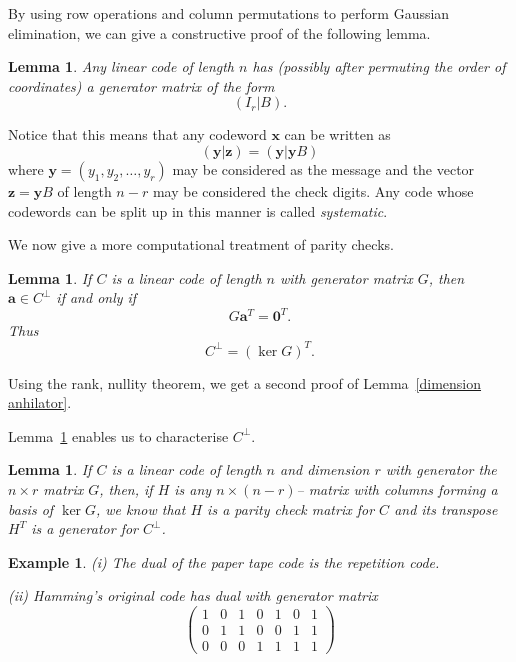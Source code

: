 \documentclass[12pt,a4paper]{article}
\theoremstyle{plain}
\newtheorem{lemma}[theorem]{Lemma}
\newtheorem{example}[theorem]{Example}
\theoremstyle{definition}
\begin{document}
    By using row operations and column permutations
    to perform Gaussian elimination, we
    can give a constructive proof of
    the following lemma.
    \begin{lemma}
        Any linear code of length $n$ has
        (possibly after permuting the order of coordinates)
        a generator matrix of the form
        \[(I_{r}|B).\]
    \end{lemma}
    Notice that this means that any codeword ${\mathbf x}$
    can be written as
    \[({\mathbf y}|{\mathbf z})=({\mathbf y}|{\mathbf y}B)\]
    where ${\mathbf y}=(y_{1},y_{2},\dots,y_{r})$ may
    be considered as the message and the vector
    ${\mathbf z}={\mathbf y}B$ of length $n-r$ may
    be considered the check digits. Any code whose codewords
    can be split up in this manner is called \emph{systematic}.

    We now give a more computational treatment of parity checks.
    \begin{lemma}
        \label{kernel} If $C$ is a linear code
        of length $n$
        with generator matrix $G$, then ${\mathbf a}\in C^{\perp}$
        if and only if
        \[G{\mathbf a}^{T}={\boldsymbol  0}^{T}.\]
        Thus
        \[C^{\perp}=(\ker G)^{T}.\]
    \end{lemma}
    \noindent
    Using the rank, nullity theorem,
    we get a second proof of Lemma~\ref{dimension anhilator}.

    Lemma~\ref{kernel} enables us to characterise
    $C^{\perp}$.
    \begin{lemma}
        If $C$ is a linear code of length $n$
        and dimension $r$ with generator the $n\times r$
        matrix $G$, then, if $H$ is any $n\times(n-r)$--
        matrix with columns forming a basis of $\ker G$,
        we know that $H$ is a parity check
        matrix for $C$ and its transpose $H^{T}$ is a
        generator for $C^{\perp}$.
    \end{lemma}
    \begin{example}
        (i) The dual of the paper tape
        code is the repetition code.

        (ii) Hamming's original code has dual with generator
        matrix
        \[\begin{pmatrix}
              1&0&1&0&1&0&1\\
              0&1&1&0&0&1&1\\
              0&0&0&1&1&1&1
        \end{pmatrix}\]
    \end{example}
\end{document}
